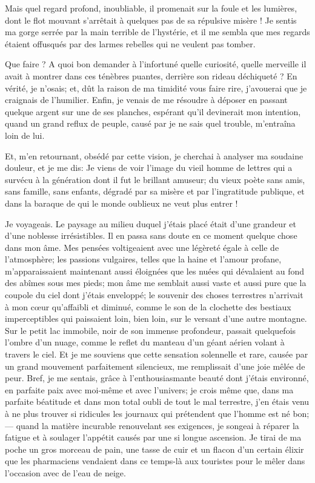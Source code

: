 Mais quel regard profond, inoubliable, il promenait sur la foule et les
lumières, dont le flot mouvant s’arrêtait à quelques
pas de sa répulsive misère ! Je sentis ma gorge serrée par la main
terrible de l’hystérie, et il me sembla que mes
regards étaient offusqués par des larmes rebelles qui ne veulent pas
tomber.

Que faire ? A quoi bon demander à l’infortuné quelle
curiosité, quelle merveille il avait à montrer dans ces ténèbres
puantes, derrière son rideau déchiqueté ? En vérité, je
n’osais; et, dût la raison de ma timidité vous faire
rire, j’avouerai que je craignais de
l’humilier. Enfin, je venais de me résoudre à déposer
en passant quelque argent sur une de ses planches, espérant
qu’il devinerait mon intention, quand un grand reflux
de peuple, causé par je ne sais quel trouble,
m’entraîna loin de lui.

Et, m’en retournant, obsédé par cette vision, je
cherchai à analyser ma soudaine douleur, et je me dis: Je viens de voir
l’image du vieil homme de lettres qui a survécu à la
génération dont il fut le brillant amuseur; du vieux poète sans amis,
sans famille, sans enfants, dégradé par sa misère et par
l’ingratitude publique, et dans la baraque de qui le
monde oublieux ne veut plus entrer !


Je voyageais. Le paysage au milieu duquel j’étais placé
était d’une grandeur et d’une
noblesse irrésistibles. Il en passa sans doute en ce moment quelque
chose dans mon âme. Mes pensées voltigeaient avec une légèreté égale à
celle de l’atmosphère; les passions vulgaires, telles
que la haine et l’amour profane,
m’apparaissaient maintenant aussi éloignées que les
nuées qui dévalaient au fond des abîmes sous mes pieds; mon âme me
semblait aussi vaste et aussi pure que la coupole du ciel dont
j’étais enveloppé; le souvenir des choses terrestres
n’arrivait à mon c\oe ur qu’affaibli et
diminué, comme le son de la clochette des bestiaux imperceptibles qui
paissaient loin, bien loin, sur le versant d’une autre
montagne. Sur le petit lac immobile, noir de son immense profondeur,
passait quelquefois l’ombre d’un
nuage, comme le reflet du manteau d’un géant aérien
volant à travers le ciel. Et je me souviens que cette sensation
solennelle et rare, causée par un grand mouvement parfaitement
silencieux, me remplissait d’une joie mêlée de peur.
Bref, je me sentais, grâce à l’enthousiasmante beauté
dont j’étais environné, en parfaite paix avec
moi{}-même et avec l’univers; je crois même que, dans
ma parfaite béatitude et dans mon total oubli de tout le mal terrestre,
j’en étais venu à ne plus trouver si ridicules les
journaux qui prétendent que l’homme est né bon; ---
quand la matière incurable renouvelant ses exigences, je songeai à
réparer la fatigue et à soulager l’appétit causés par
une si longue ascension. Je tirai de ma poche un gros morceau de pain,
une tasse de cuir et un flacon d’un certain élixir que
les pharmaciens vendaient dans ce temps{}-là aux touristes pour le
mêler dans l’occasion avec de l’eau
de neige.

